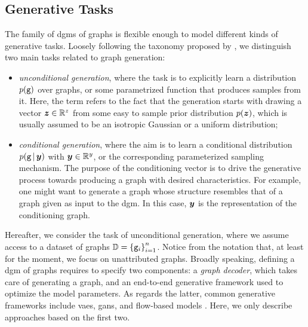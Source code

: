 \subsection{Generative Tasks}
The family of \glspl{dgm} of graphs is flexible enough to model different kinds of generative tasks. Loosely following the taxonomy proposed by \citet{guo2020systematicreviewgenerativegraphs}, we distinguish two main tasks related to graph generation:
\begin{itemize}
    \item \emph{unconditional generation}, where the task is to explicitly learn a distribution $p(\mathtt{g})$ over graphs, or some parametrized function that produces samples from it. Here, the term  refers to the fact that the generation starts with drawing a vector $\Vector{z} \in \Real^z$ from some easy to sample prior distribution $p(\Vector{z})$, which is usually assumed to be an isotropic Gaussian or a uniform distribution;
    \item \emph{conditional generation}, where the aim is to learn a conditional distribution $p(\Graph{g} \given \Vector{y})$ with $\Vector{y} \in \Real^y$, or the corresponding parameterized sampling mechanism. The purpose of the conditioning vector is to drive the generative process towards producing a graph with desired characteristics. For example, one might want to generate a graph whose structure resembles that of a graph given as input to the \gls{dgm}. In this case, $\Vector{y}$ is the representation of the conditioning graph.
\end{itemize}
Hereafter, we consider the task of unconditional generation, where we assume access to a dataset of graphs $\mathbb{D} = \left\{ \mathtt{g}_i \right\}_{i=1}^n$. Notice from the notation that, at least for the moment, we focus on unattributed graphs. Broadly speaking, defining a \gls{dgm} of graphs requires to specify two components: a \emph{graph decoder}, which takes care of generating a graph, and an end-to-end generative framework used to optimize the model parameters. As regards the latter, common generative frameworks include \glspl{vae}, \glspl{gan}, and flow-based models \citep{rezende2015normalizingflows}. Here, we only describe approaches based on the first two.

